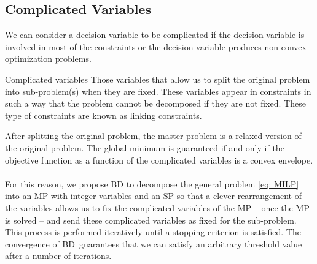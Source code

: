 \subsection{Complicated Variables}
We can consider a decision variable to be complicated if the decision variable is involved in most of the constraints or the decision variable produces non-convex optimization problems. 
\begin{definition}{Complicated variables}
Those variables that allow us to split the original problem into sub-problem(s) when they are fixed. These variables appear in constraints in such a way that the problem cannot be decomposed if they are not fixed. These type of constraints are known as linking constraints. 
\end{definition}
After splitting the original problem, the master problem is a relaxed version of the original problem. The global minimum is guaranteed if and only if the objective function as a function of the complicated variables is a convex envelope.\\\\
For this reason, we propose BD to decompose the general problem \eqref{eq: MILP} into an MP with integer variables and an SP so that a clever rearrangement of the variables allows us to fix the complicated variables of the MP -- once the MP is solved -- and send these complicated variables as fixed for the sub-problem. This process is performed iteratively until a stopping criterion is satisfied. The convergence of BD\,\cite{Sahinidis1991BDConvergence} guarantees that we can satisfy an arbitrary threshold value after a number of iterations. 
